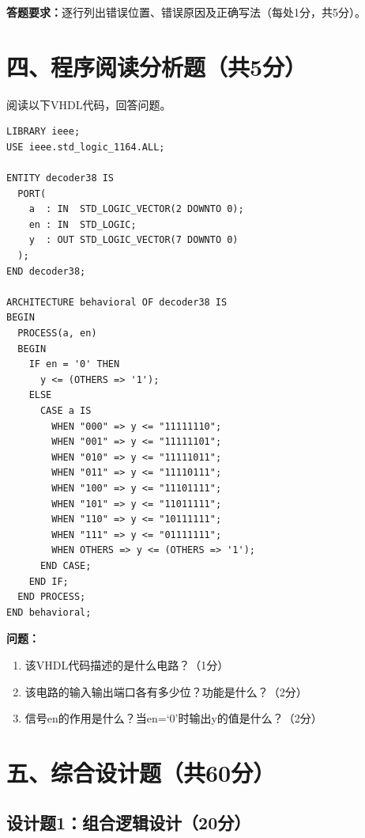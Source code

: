 \begin{framed}
\textbf{答题要求：}逐行列出错误位置、错误原因及正确写法（每处1分，共5分）。
\end{framed}

\newpage

\section*{四、程序阅读分析题（共5分）}

阅读以下VHDL代码，回答问题。

\begin{lstlisting}[caption={分析用VHDL代码}]
LIBRARY ieee;
USE ieee.std_logic_1164.ALL;

ENTITY decoder38 IS
  PORT(
    a  : IN  STD_LOGIC_VECTOR(2 DOWNTO 0);
    en : IN  STD_LOGIC;
    y  : OUT STD_LOGIC_VECTOR(7 DOWNTO 0)
  );
END decoder38;

ARCHITECTURE behavioral OF decoder38 IS
BEGIN
  PROCESS(a, en)
  BEGIN
    IF en = '0' THEN
      y <= (OTHERS => '1');
    ELSE
      CASE a IS
        WHEN "000" => y <= "11111110";
        WHEN "001" => y <= "11111101";
        WHEN "010" => y <= "11111011";
        WHEN "011" => y <= "11110111";
        WHEN "100" => y <= "11101111";
        WHEN "101" => y <= "11011111";
        WHEN "110" => y <= "10111111";
        WHEN "111" => y <= "01111111";
        WHEN OTHERS => y <= (OTHERS => '1');
      END CASE;
    END IF;
  END PROCESS;
END behavioral;
\end{lstlisting}

\begin{framed}
\textbf{问题：}
\begin{enumerate}[label=(\arabic*)]
  \item 该VHDL代码描述的是什么电路？（1分）
  \item 该电路的输入输出端口各有多少位？功能是什么？（2分）
  \item 信号en的作用是什么？当en=‘0’时输出y的值是什么？（2分）
\end{enumerate}
\end{framed}

\newpage

\section*{五、综合设计题（共60分）}

\subsection*{设计题1：组合逻辑设计（20分）}

